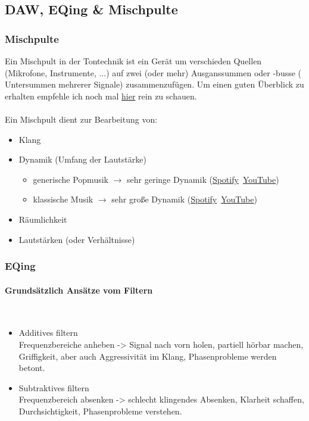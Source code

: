 \subsection{DAW, EQing \& Mischpulte}

\subsubsection{Mischpulte}

Ein Mischpult in der Tontechnik ist ein Gerät um verschieden Quellen \\(Mikrofone, Instrumente, ...) auf zwei (oder mehr) Ausganssummen oder -busse ( Untersummen mehrerer Signale) zusammenzufügen. 
Um einen guten Überblick zu erhalten empfehle ich noch mal \href{https://www.tontechnik-seminar.de/mischpult/mischpult-beispiel/}{hier} rein zu schauen.\\~\\

Ein Mischpult dient zur Bearbeitung von:
\begin{itemize}
    \item Klang
    \item Dynamik (Umfang der Lautstärke)
        \begin{itemize}
            \item generische Popmusik $\rightarrow$ sehr geringe Dynamik (\href{https://open.spotify.com/intl-de/track/6wgmzw64fvWGVNfDRbOHFh?si=d58caac6be5c46d1}{Spotify}~\href{https://youtu.be/w6LCfdzK92I?si=DPN0Gv5c4ZKfD83w}{YouTube})~
            \item klassische Musik $\rightarrow$ sehr große Dynamik (\href{https://open.spotify.com/intl-de/track/3gFQOMoUwlR6aUZj81gCzu?si=92ac7cfb89344e18}{Spotify}~\href{https://youtu.be/fawhjImDdJA?si=hyUGufzkj1buqda6}{YouTube})
        \end{itemize}
    \item Räumlichkeit
    \item Lautstärken (oder Verhältnisse)
\end{itemize}


\subsubsection{EQing}

\paragraph{Grundsätzlich Ansätze vom Filtern}~\\
\begin{itemize}
    \item Additives filtern\\
    Frequenzbereiche anheben -> Signal nach vorn holen, partiell hörbar machen, Griffigkeit, aber auch Aggressivität im Klang, Phasenprobleme werden betont.
    \item Subtraktives filtern\\
    Frequenzbereich absenken -> schlecht klingendes Absenken, Klarheit schaffen, Durchsichtigkeit, Phasenprobleme verstehen.
\end{itemize}

